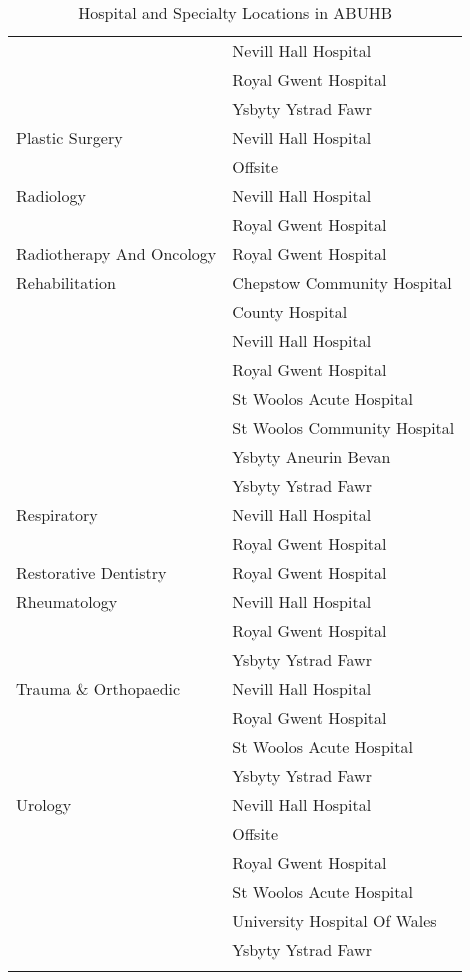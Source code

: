 \documentclass[thesis.tex]{subfiles}
\begin{document}
\begin{center}
\begin{longtable}{ll}
	&Nevill Hall Hospital\\
	&Royal Gwent Hospital\\
	&Ysbyty Ystrad Fawr\\\midrule
Plastic Surgery	&Nevill Hall Hospital\\
&	Offsite\\\midrule
Radiology	&Nevill Hall Hospital\\
	&Royal Gwent Hospital\\\midrule
Radiotherapy And Oncology&	Royal Gwent Hospital\\\midrule
Rehabilitation&	Chepstow Community Hospital\\
	&County Hospital\\
	&Nevill Hall Hospital\\
	&Royal Gwent Hospital\\
	&St Woolos Acute Hospital\\
	&St Woolos Community Hospital\\
	&Ysbyty Aneurin Bevan\\
	&Ysbyty Ystrad Fawr\\\midrule
Respiratory	&Nevill Hall Hospital\\
	&Royal Gwent Hospital\\\midrule
Restorative Dentistry&	Royal Gwent Hospital\\\midrule
Rheumatology&	Nevill Hall Hospital\\
	&Royal Gwent Hospital\\
	&Ysbyty Ystrad Fawr\\\midrule
Trauma \& Orthopaedic&	Nevill Hall Hospital\\
	&Royal Gwent Hospital\\
	&St Woolos Acute Hospital\\
	&Ysbyty Ystrad Fawr\\\midrule
Urology	&Nevill Hall Hospital\\
	&Offsite\\
	&Royal Gwent Hospital\\
	&St Woolos Acute Hospital\\
	&University Hospital Of Wales\\
	&Ysbyty Ystrad Fawr\\\midrule
    \caption{Hospital and Specialty Locations in ABUHB}
    \label{tab:app_ABUHBHospLoc}
    \end{longtable}
        
    
\end{center}
\end{document}
